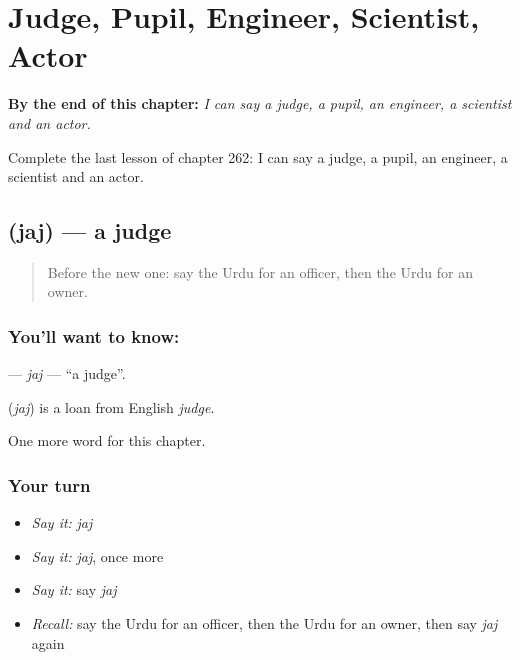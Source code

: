 
\chapter{Judge, Pupil, Engineer, Scientist, Actor}
\label{ch:ur-judge-pupil-engineer-scientist-actor}

\begin{chapteropening}
\textbf{By the end of this chapter:} \emph{I can say a judge, a pupil, an engineer, a scientist and an actor.}

Complete the last lesson of chapter 262: I can say a judge, a pupil, an engineer, a scientist and an actor.
\end{chapteropening}

\section[\texorpdfstring{\ur{جج} (jaj)}{جج (jaj)}]{ (jaj) — a judge}

\label{lesson:UR-C262-jaj}



\begin{quote}
Before the new one: say the Urdu for an officer, then the Urdu for an owner.
\end{quote}

\subsection*{You'll want to know: }
\textbf{} — \emph{jaj} — \textquotedblleft{}a judge\textquotedblright{}.

\begin{cousinweb}
\textbf{} (\emph{jaj}) is a loan from English \emph{judge}.
\end{cousinweb}

\begin{grammarlens}[title={What you've built}]
One more word for this chapter.
\end{grammarlens}

\subsection*{Your turn}
\begin{itemize}
\raggedright
  \item \emph{Say it:} \emph{jaj}
  \item \emph{Say it:} \emph{jaj}, once more
  \item \emph{Say it:} say \emph{jaj}
  \item \emph{Recall:} say the Urdu for an officer, then the Urdu for an owner, then say \emph{jaj} again
\end{itemize}

